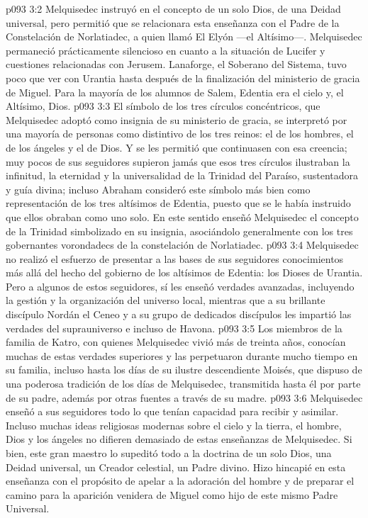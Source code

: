\vs p093 3:2 Melquisedec instruyó en el concepto de un solo Dios, de una Deidad universal, pero permitió que se relacionara esta enseñanza con el Padre de la Constelación de Norlatiadec, a quien llamó El Elyón ---el Altísimo---. Melquisedec permaneció prácticamente silencioso en cuanto a la situación de Lucifer y cuestiones relacionadas con Jerusem. Lanaforge, el Soberano del Sistema, tuvo poco que ver con Urantia hasta después de la finalización del ministerio de gracia de Miguel. Para la mayoría de los alumnos de Salem, Edentia era el cielo y, el Altísimo, Dios.
\vs p093 3:3 El símbolo de los tres círculos concéntricos, que Melquisedec adoptó como insignia de su ministerio de gracia, se interpretó por una mayoría de personas como distintivo de los tres reinos: el de los hombres, el de los ángeles y el de Dios. Y se les permitió que continuasen con esa creencia; muy pocos de sus seguidores supieron jamás que esos tres círculos ilustraban la infinitud, la eternidad y la universalidad de la Trinidad del Paraíso, sustentadora y guía divina; incluso Abraham consideró este símbolo más bien como representación de los tres altísimos de Edentia, puesto que se le había instruido que ellos obraban como uno solo. En este sentido enseñó Melquisedec el concepto de la Trinidad simbolizado en su insignia, asociándolo generalmente con los tres gobernantes vorondadecs de la constelación de Norlatiadec.
\vs p093 3:4 Melquisedec no realizó el esfuerzo de presentar a las bases de sus seguidores conocimientos más allá del hecho del gobierno de los altísimos de Edentia: los Dioses de Urantia. Pero a algunos de estos seguidores, sí les enseñó verdades avanzadas, incluyendo la gestión y la organización del universo local, mientras que a su brillante discípulo Nordán el Ceneo y a su grupo de dedicados discípulos les impartió las verdades del suprauniverso e incluso de Havona.
\vs p093 3:5 Los miembros de la familia de Katro, con quienes Melquisedec vivió más de treinta años, conocían muchas de estas verdades superiores y las perpetuaron durante mucho tiempo en su familia, incluso hasta los días de su ilustre descendiente Moisés, que dispuso de una poderosa tradición de los días de Melquisedec, transmitida hasta él por parte de su padre, además por otras fuentes a través de su madre.
\vs p093 3:6 Melquisedec enseñó a sus seguidores todo lo que tenían capacidad para recibir y asimilar. Incluso muchas ideas religiosas modernas sobre el cielo y la tierra, el hombre, Dios y los ángeles no difieren demasiado de estas enseñanzas de Melquisedec. Si bien, este gran maestro lo supeditó todo a la doctrina de un solo Dios, una Deidad universal, un Creador celestial, un Padre divino. Hizo hincapié en esta enseñanza con el propósito de apelar a la adoración del hombre y de preparar el camino para la aparición venidera de Miguel como hijo de este mismo Padre Universal.
